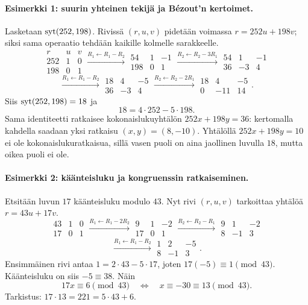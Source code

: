 \documentclass[11pt,a4paper]{amsart}
\begin{document}
\paragraph{Esimerkki 1: suurin yhteinen tekijä ja Bézout'n kertoimet.}
Lasketaan $\operatorname{syt}(252,198)$. Rivissä $(r,u,v)$ pidetään voimassa
$r=252u+198v$; siksi sama operaatio tehdään kaikille kolmelle sarakkeelle.
\[
  \begin{array}{c|rr}
    r&u&v\\\hline
    252&1&0\\198&0&1
  \end{array}
  \xrightarrow{R_1\leftarrow R_1-R_2}
  \begin{array}{c|rr}
    54&1&-1\\198&0&1
  \end{array}
  \xrightarrow{R_2\leftarrow R_2-3R_1}
  \begin{array}{c|rr}
    54&1&-1\\36&-3&4
  \end{array}
\]
\[
  \xrightarrow{R_1\leftarrow R_1-R_2}
  \begin{array}{c|rr}
    18&4&-5\\36&-3&4
  \end{array}
  \xrightarrow{R_2\leftarrow R_2-2R_1}
  \begin{array}{c|rr}
    18&4&-5\\0&-11&14
  \end{array}.
\]
Siis $\operatorname{syt}(252,198)=18$ ja
\[
  \boxed{18=4\cdot252-5\cdot198.}
\]
Sama identiteetti ratkaisee kokonaislukuyhtälön $252x+198y=36$:
kertomalla kahdella saadaan yksi ratkaisu $(x,y)=(8,-10)$.
Yhtälöllä $252x+198y=10$ ei ole kokonaislukuratkaisua, sillä vasen
puoli on aina jaollinen luvulla $18$, mutta oikea puoli ei ole.

\paragraph{Esimerkki 2: käänteisluku ja kongruenssin ratkaiseminen.}
Etsitään luvun $17$ käänteisluku modulo $43$. Nyt rivi $(r,u,v)$
tarkoittaa yhtälöä $r=43u+17v$.
\[
  \begin{array}{c|rr}
    43&1&0\\17&0&1
  \end{array}
  \xrightarrow{R_1\leftarrow R_1-2R_2}
  \begin{array}{c|rr}
    9&1&-2\\17&0&1
  \end{array}
  \xrightarrow{R_2\leftarrow R_2-R_1}
  \begin{array}{c|rr}
    9&1&-2\\8&-1&3
  \end{array}
\]
\[
  \xrightarrow{R_1\leftarrow R_1-R_2}
  \begin{array}{c|rr}
    1&2&-5\\8&-1&3
  \end{array}.
\]
Ensimmäinen rivi antaa $1=2\cdot43-5\cdot17$, joten
$17(-5)\equiv1\pmod{43}$. Käänteisluku on siis $-5\equiv38$.
Näin
\[
  17x\equiv6\pmod{43}
  \quad\Longleftrightarrow\quad
  x\equiv-30\equiv13\pmod{43}.
\]
Tarkistus: $17\cdot13=221=5\cdot43+6$.
\end{document}

